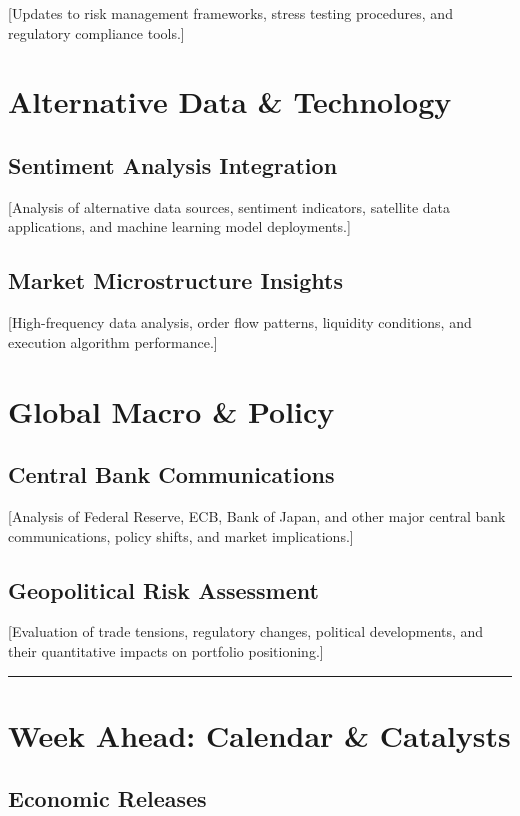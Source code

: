 \documentclass[11pt,a4paper]{article}
\newcommand{\sectionbreak}{%
    \vspace{0.5cm}
    \begin{center}
        \color{mediumgray}
        \rule{0.3\textwidth}{0.4pt}
    \end{center}
    \vspace{0.3cm}
}
\begin{document}
[Updates to risk management frameworks, stress testing procedures, and regulatory compliance tools.]

\section{Alternative Data \& Technology}

\subsection{Sentiment Analysis Integration}

[Analysis of alternative data sources, sentiment indicators, satellite data applications, and machine learning model deployments.]

\subsection{Market Microstructure Insights}

[High-frequency data analysis, order flow patterns, liquidity conditions, and execution algorithm performance.]

\section{Global Macro \& Policy}

\subsection{Central Bank Communications}

[Analysis of Federal Reserve, ECB, Bank of Japan, and other major central bank communications, policy shifts, and market implications.]

\subsection{Geopolitical Risk Assessment}

[Evaluation of trade tensions, regulatory changes, political developments, and their quantitative impacts on portfolio positioning.]

\sectionbreak

\section{Week Ahead: Calendar \& Catalysts}

\subsection{Economic Releases}
\end{document}
